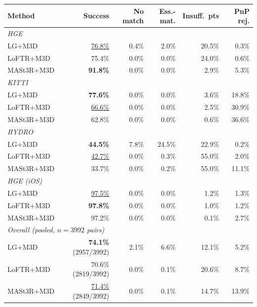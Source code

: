 \begin{table}[htb]
  \centering
  \scriptsize
  \renewcommand{\arraystretch}{0.92}
  \begin{tabular*}{\textwidth}{@{\extracolsep{\fill}} lrrrrr}
  \hline
  \textbf{Method} & \textbf{Success} & \textbf{No match} & \textbf{Ess.-mat.} & \textbf{Insuff.\ pts} & \textbf{PnP rej.} \\
  \hline
  \multicolumn{6}{l}{\textit{HGE}} \\
  LG+M3D & \underline{76.8\%} & 0.4\% & 2.0\% & 20.5\% & 0.3\% \\
  LoFTR+M3D & 75.4\% & 0.0\% & 0.0\% & 24.0\% & 0.6\% \\
  MASt3R+M3D & \textbf{91.8\%} & 0.0\% & 0.0\% & 2.9\% & 5.3\% \\
  \hline
  \multicolumn{6}{l}{\textit{KITTI}} \\
  LG+M3D & \textbf{77.6\%} & 0.0\% & 0.0\% & 3.6\% & 18.8\% \\
  LoFTR+M3D & \underline{66.6\%} & 0.0\% & 0.0\% & 2.5\% & 30.9\% \\
  MASt3R+M3D & 62.8\% & 0.0\% & 0.0\% & 0.6\% & 36.6\% \\
  \hline
  \multicolumn{6}{l}{\textit{HYDRO}} \\
  LG+M3D & \textbf{44.5\%} & 7.8\% & 24.5\% & 22.9\% & 0.2\% \\
  LoFTR+M3D & \underline{42.7\%} & 0.0\% & 0.3\% & 55.0\% & 2.0\% \\
  MASt3R+M3D & 33.7\% & 0.0\% & 0.2\% & 55.0\% & 11.1\% \\
  \hline
  \multicolumn{6}{l}{\textit{HGE (iOS)}} \\
  LG+M3D & \underline{97.5\%} & 0.0\% & 0.0\% & 1.2\% & 1.3\% \\
  LoFTR+M3D & \textbf{97.8\%} & 0.0\% & 0.0\% & 1.0\% & 1.2\% \\
  MASt3R+M3D & 97.2\% & 0.0\% & 0.0\% & 0.1\% & 2.7\% \\
  \hline
  \multicolumn{6}{l}{\textit{Overall (pooled, $n{=}3992$ pairs)}} \\
  LG+M3D & \textbf{74.1\%} (2957/3992) & 2.1\% & 6.6\% & 12.1\% & 5.2\% \\
  LoFTR+M3D & 70.6\% (2819/3992) & 0.0\% & 0.1\% & 20.6\% & 8.7\% \\
  MASt3R+M3D & \underline{71.4\%} (2849/3992) & 0.0\% & 0.1\% & 14.7\% & 13.9\% \\
  \hline
  \end{tabular*}
  \smallskip


\end{table}
